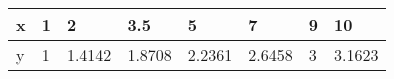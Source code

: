 \documentclass{article}
\begin{document}
\begin{table}[h!]
\begin{tabular}{l|l|l|l|l|l|l|l}

\multicolumn{1}{p{30.865313pt}}{\raggedright x} & \multicolumn{1}{|p{30.865313pt}}{\raggedright 1} & \multicolumn{1}{|p{32.370937pt}}{\raggedright 2} & \multicolumn{1}{|p{33.876564pt}}{\raggedright 3.5} & \multicolumn{1}{|p{37.640625pt}}{\raggedright 5} & \multicolumn{1}{|p{33.876564pt}}{\raggedright 7} & \multicolumn{1}{|p{30.1125pt}}{\raggedright 9} & \multicolumn{1}{|p{33.876564pt}}{\raggedright 10}\\ 
\hline 
\multicolumn{1}{p{30.865313pt}}{\raggedright y} & \multicolumn{1}{|p{30.865313pt}}{\raggedright 1} & \multicolumn{1}{|p{32.370937pt}}{\raggedright 1.4142} & \multicolumn{1}{|p{33.876564pt}}{\raggedright 1.8708} & \multicolumn{1}{|p{37.640625pt}}{\raggedright 2.2361} & \multicolumn{1}{|p{33.876564pt}}{\raggedright 2.6458} & \multicolumn{1}{|p{30.1125pt}}{\raggedright 3} & \multicolumn{1}{|p{33.876564pt}}{\raggedright 3.1623}\\ 


\end{tabular}
\end{table}
\end{document}
